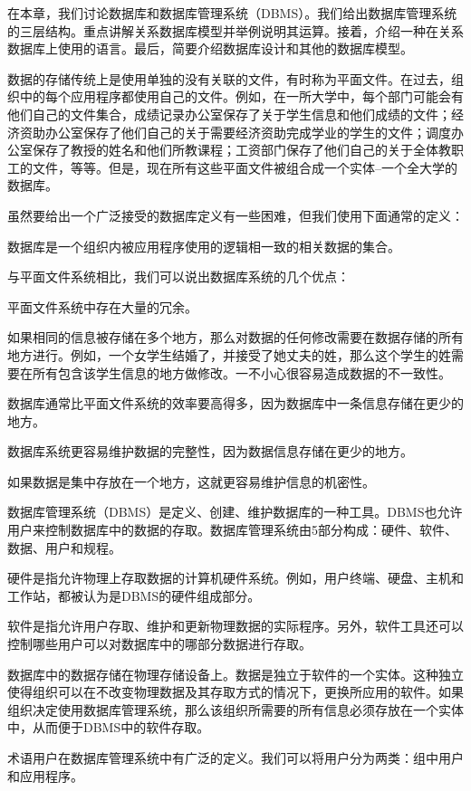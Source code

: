 
在本章，我们讨论数据库和数据库管理系统（DBMS）。我们给出数据库管理系统的三层结构。重点讲解关系数据库模型并举例说明其运算。接着，介绍一种在关系数据库上使用的语言。最后，简要介绍数据库设计和其他的数据库模型。

数据的存储传统上是使用单独的没有关联的文件，有时称为平面文件。在过去，组织中的每个应用程序都使用自己的文件。例如，在一所大学中，每个部门可能会有他们自己的文件集合，成绩记录办公室保存了关于学生信息和他们成绩的文件；经济资助办公室保存了他们自己的关于需要经济资助完成学业的学生的文件；调度办公室保存了教授的姓名和他们所教课程；工资部门保存了他们自己的关于全体教职工的文件，等等。但是，现在所有这些平面文件被组合成一个实体--一个全大学的数据库。

虽然要给出一个广泛接受的数据库定义有一些困难，但我们使用下面通常的定义：

数据库是一个组织内被应用程序使用的逻辑相一致的相关数据的集合。

与平面文件系统相比，我们可以说出数据库系统的几个优点：

平面文件系统中存在大量的冗余。

如果相同的信息被存储在多个地方，那么对数据的任何修改需要在数据存储的所有地方进行。例如，一个女学生结婚了，并接受了她丈夫的姓，那么这个学生的姓需要在所有包含该学生信息的地方做修改。一不小心很容易造成数据的不一致性。

数据库通常比平面文件系统的效率要高得多，因为数据库中一条信息存储在更少的地方。

数据库系统更容易维护数据的完整性，因为数据信息存储在更少的地方。

如果数据是集中存放在一个地方，这就更容易维护信息的机密性。

数据库管理系统（DBMS）是定义、创建、维护数据库的一种工具。DBMS也允许用户来控制数据库中的数据的存取。数据库管理系统由5部分构成：硬件、软件、数据、用户和规程。

硬件是指允许物理上存取数据的计算机硬件系统。例如，用户终端、硬盘、主机和工作站，都被认为是DBMS的硬件组成部分。

软件是指允许用户存取、维护和更新物理数据的实际程序。另外，软件工具还可以控制哪些用户可以对数据库中的哪部分数据进行存取。

数据库中的数据存储在物理存储设备上。数据是独立于软件的一个实体。这种独立使得组织可以在不改变物理数据及其存取方式的情况下，更换所应用的软件。如果组织决定使用数据库管理系统，那么该组织所需要的所有信息必须存放在一个实体中，从而便于DBMS中的软件存取。

术语用户在数据库管理系统中有广泛的定义。我们可以将用户分为两类：组中用户和应用程序。

